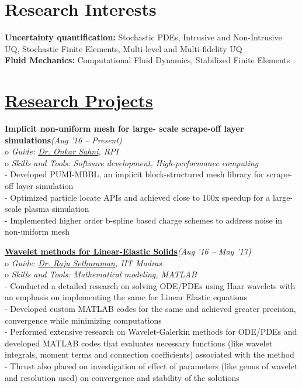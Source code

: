 \documentclass[margin,line]{res}
\begin{document}
\begin{resume}
\section {\sc Research Interests}
\textbullet\hspace{0.005cm} {\bf Uncertainty quantification:} Stochastic PDEs, Intrusive and Non-Intrusive UQ, Stochastic Finite Elements, Multi-level and Multi-fidelity UQ\\
\textbullet\hspace{0.005cm} {\bf Fluid Mechanics:} Computational Fluid Dynamics, Stabilized Finite Elements

\section {\sc \href{https://vickyragav95.github.io/research.html}{\color{RoyalPurple}Research Projects}}
\textbullet\hspace{0.005cm} {\bf Implicit non-uniform mesh for large-
	scale scrape-off layer simulations}\hfill {\em (Aug '16 -- Present)}\\
o {\em Guide: \href {https://homepages.rpi.edu/~sahni/} {\color{RoyalPurple} Dr. Onkar Sahni}, RPI}\\
o {\em Skills and Tools:  Software development, High-performance computing}\\
- Developed PUMI-MBBL, an implicit block-structured
mesh library for scrape-off layer simulation\\
- Optimized particle locate APIs and achieved close to
100x speedup for a large-scale plasma simulation\\
- Implemented higher order b-spline based charge
schemes to address noise in non-uniform mesh

\textbullet\hspace{0.005cm} \href{https://sites.google.com/site/vigneshsrinivasaragavan/research}{{\bf Wavelet methods for Linear-Elastic Solids}}\hfill {\em (Aug '16 -- May '17)}\\
o {\em Guide: \href {https://mech.iitm.ac.in/meiitm/personnal/raju-sethuraman/} {\color{RoyalPurple} Dr. Raju Sethuraman}, IIT Madras}\\
o {\em Skills and Tools:  Mathematical modeling, MATLAB}\\
- Conducted a detailed research on solving ODE/PDEs using Haar wavelets with an emphasis on implementing the same for Linear Elastic equations\\
- Developed custom MATLAB codes for the same and achieved greater precision, convergence while minimizing computations\\ 
- Performed extensive research on Wavelet-Galerkin methods for ODE/PDEs and developed MATLAB codes that evaluates necessary functions (like wavelet integrals, moment terms and connection coefficients) associated with the method\\
- Thrust also placed on investigation of effect of parameters (like genus of wavelet and resolution used) on convergence and stability of the solutions


\end{resume}
\end{document}

